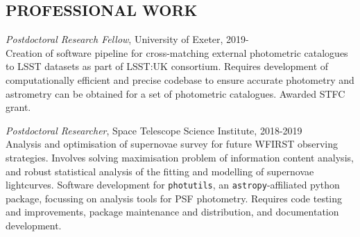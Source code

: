 \documentclass[letter, margin, 10pt]{res} %
\begin{document}
\begin{resume}

 


\vspace{-14pt}
\section{PROFESSIONAL WORK}

{\sl Postdoctoral Research Fellow}, University of Exeter, 2019-\\
Creation of software pipeline for cross-matching external photometric catalogues to LSST datasets as part of LSST:UK consortium. Requires development of computationally efficient and precise codebase to ensure accurate photometry and astrometry can be obtained for a set of photometric catalogues. Awarded STFC grant.

{\sl Postdoctoral Researcher}, Space Telescope Science Institute, 2018-2019\\
Analysis and optimisation of supernovae survey for future WFIRST observing strategies. Involves solving maximisation problem of information content analysis, and robust statistical analysis of the fitting and modelling of supernovae lightcurves. Software development for \texttt{photutils}, an \texttt{astropy}-affiliated python package, focussing on analysis tools for PSF photometry. Requires code testing and improvements, package maintenance and distribution, and documentation development.
\vspace{-5pt}

\end{resume}
\end{document}

